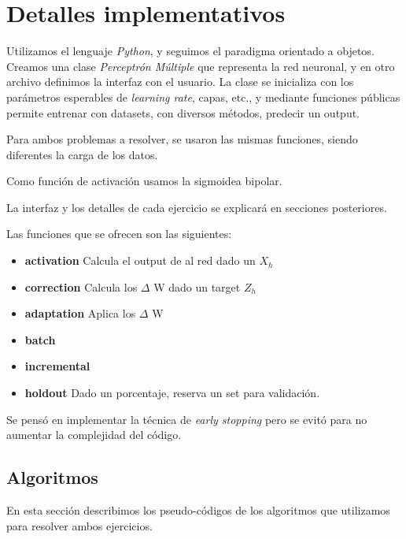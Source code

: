 \section{Detalles implementativos}
Utilizamos el lenguaje \textit{Python}, y seguimos el paradigma orientado a objetos. Creamos una clase \textit{Perceptrón Múltiple} que representa la red neuronal, y en otro archivo definimos la interfaz con el usuario. La clase se inicializa con los parámetros esperables de \textit{learning rate}, capas, etc., y mediante funciones públicas permite entrenar con datasets, con diversos métodos, predecir un output. 

Para ambos problemas a resolver, se usaron las mismas funciones, siendo diferentes la carga de los datos. 

Como función de activación usamos la sigmoidea bipolar. 

La interfaz y los detalles de cada ejercicio se explicará en secciones posteriores. 

Las funciones que se ofrecen son las siguientes:
\begin{itemize}
\item \textbf{activation} Calcula el output de al red dado un $X_{h}$
\item \textbf{correction} Calcula los $\Delta$ W dado un target $Z_{h}$
\item \textbf{adaptation} Aplica los $\Delta$ W 
\item \textbf{batch} 
\item \textbf{incremental}
\item \textbf{holdout} Dado un porcentaje, reserva un set para validación. 
\end{itemize}

Se pensó en implementar la técnica de \textit{early stopping} pero se evitó para no aumentar la complejidad del código.

\subsection{Algoritmos}
En esta sección describimos los pseudo-códigos de los algoritmos que utilizamos para resolver ambos ejercicios.
\begin{center}
\noindent{}
\end{center}

